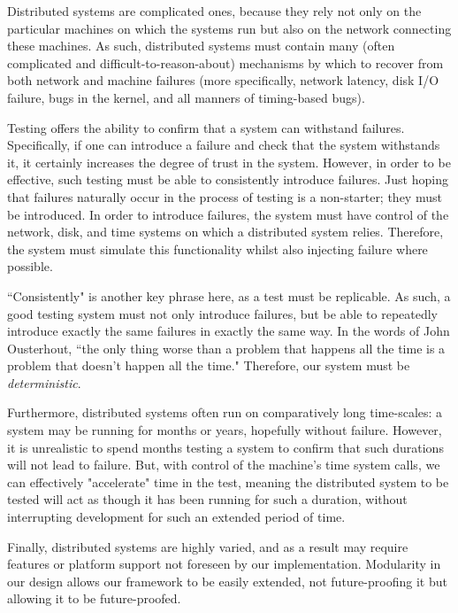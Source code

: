 {\fontsize{12}{15}\selectfont 
Distributed systems are complicated ones,
because they rely not only on the particular machines
on which the systems run but also on the network connecting these machines.
As such, distributed systems must contain many
(often complicated and difficult-to-reason-about)
mechanisms by which to recover from both network and machine failures
(more specifically, network latency, disk I/O failure, bugs in the kernel,
and all manners of timing-based bugs).

Testing offers the ability to confirm that a system can withstand failures.
Specifically, if one can introduce a failure and check that the system withstands it,
it certainly increases the degree of trust in the system.
However, in order to be effective,
such testing must be able to consistently introduce failures.
Just hoping that failures naturally occur in the process of testing is a non-starter;
they must be introduced.
In order to introduce failures, the system must have control of the network, disk,
and time systems on which a distributed system relies.
Therefore, the system must simulate this functionality whilst also injecting failure where possible.

``Consistently" is another key phrase here,
as a test must be replicable.
As such,
a good testing system must not only introduce failures,
but be able to repeatedly introduce exactly the same failures in exactly the same way.
In the words of John Ousterhout,
``the only thing worse than a problem that happens all the time is a problem that doesn't happen all the time."
Therefore, our system must be \textit{deterministic}.

Furthermore,
distributed systems often run on comparatively long time-scales:
a system may be running for months or years,
hopefully without failure.
However,
it is unrealistic to spend months testing a system to confirm that such durations will not lead to failure.
But, with control of the machine's time system calls,
we can effectively "accelerate" time in the test,
meaning the distributed system to be tested will act as though it has been running for such a duration,
without interrupting development for such an extended period of time.

Finally,
distributed systems are highly varied,
and as a result may require features or platform support not foreseen by our implementation.
Modularity in our design allows our framework to be easily extended,
not future-proofing it but allowing it to be future-proofed.

}

